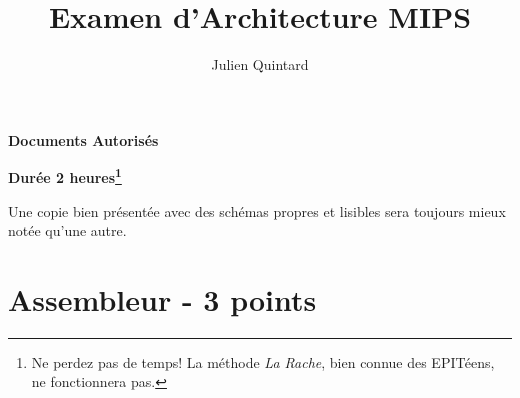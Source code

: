 %
%
%
%
%
%

%
%

%
%

\def\path{../../../..}

%
%



%
%


%
%

\title{Examen d'Architecture MIPS}

%
%

\author{\small{Julien Quintard}}

%
%



%
%

\maketitle

%
%

\indentation{}

%
%

\begin{center}

\textbf{Documents Autoris\'es}

\textbf{Dur\'ee 2
heures\footnote{Ne perdez pas de temps! La m\'ethode \textit{La Rache}, bien
                connue des EPIT\'eens, ne fonctionnera pas.}}

\scriptsize{Une copie bien pr\'esent\'ee avec des sch\'emas propres et
	    lisibles sera toujours mieux not\'ee qu'une autre.}

\end{center}

%
%

%
%

\section{Assembleur - 3 points}


